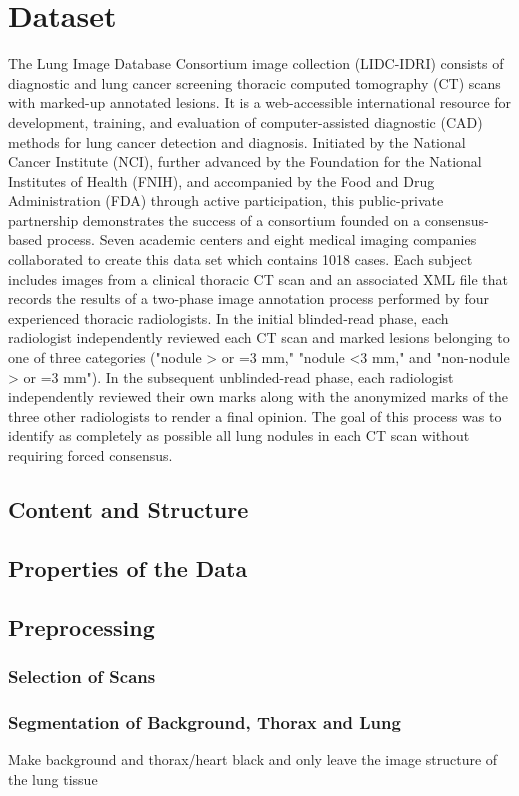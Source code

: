 \documentclass[../Thesis.tex]{subfiles}
\begin{document}
\chapter{Dataset}
The Lung Image Database Consortium image collection (LIDC-IDRI) consists of diagnostic and lung cancer screening thoracic computed tomography (CT) scans with marked-up annotated lesions. It is a web-accessible international resource for development, training, and evaluation of computer-assisted diagnostic (CAD) methods for lung cancer detection and diagnosis. Initiated by the National Cancer Institute (NCI), further advanced by the Foundation for the National Institutes of Health (FNIH), and accompanied by the Food and Drug Administration (FDA) through active participation, this public-private partnership demonstrates the success of a consortium founded on a consensus-based process.
Seven academic centers and eight medical imaging companies collaborated to create this data set which contains 1018 cases.  Each subject includes images from a clinical thoracic CT scan and an associated XML file that records the results of a two-phase image annotation process performed by four experienced thoracic radiologists. In the initial blinded-read phase, each radiologist independently reviewed each CT scan and marked lesions belonging to one of three categories ("nodule > or =3 mm," "nodule <3 mm," and "non-nodule > or =3 mm"). In the subsequent unblinded-read phase, each radiologist independently reviewed their own marks along with the anonymized marks of the three other radiologists to render a final opinion. The goal of this process was to identify as completely as possible all lung nodules in each CT scan without requiring forced consensus. \cite{armato2011lung}

\section{Content and Structure}
\section{Properties of the Data}
\section{Preprocessing}
\subsection{Selection of Scans}
\subsection{Segmentation of Background, Thorax and Lung}
Make background and thorax/heart black and only leave the image structure of the lung tissue
\end{document}

